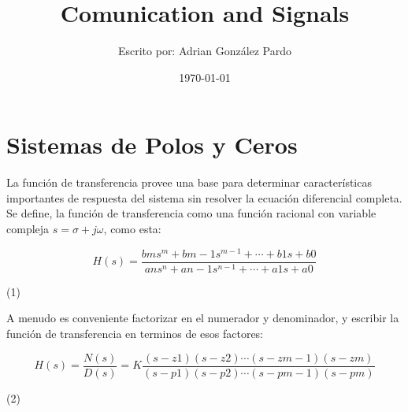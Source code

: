 \documentclass[10pt,a4paper]{article}
\title{Comunication and Signals}
\author{Escrito por: Adrian González Pardo}
\date{\today}
\begin{document}
\begin{center}
	\par\vspace{0.25cm}{
		Instituto Tecnológico de Massachusetts\\Departamento de Ingenieria Mecanica\\2.14 Análisis y diseño de sistemas de control de retroalimentación}
	\par{}
\end{center}
\section{Sistemas de Polos y Ceros}
La función de transferencia provee una base para determinar características importantes de respuesta del sistema sin resolver la ecuación diferencial completa. Se define, la función de transferencia como una función racional con variable compleja $s=\sigma + j\omega$, como esta:
\begin{center}
  \begin{minipage}{0.5\textwidth}
    \begin{center}
      \[H(s)=\frac{b{\scriptscriptstyle m}s^m+b{\scriptscriptstyle m-1}s^{m-1}+\cdots+b{\scriptscriptstyle 1}s+b{\scriptscriptstyle 0}} {a{\scriptscriptstyle n}s^n+a{\scriptscriptstyle n-1}s^{n-1}+\cdots+a{\scriptscriptstyle 1}s+a{\scriptscriptstyle 0}}\]
    \end{center}

  \end{minipage}
  \begin{minipage}{0.9\textwidth}
    \begin{flushright}
        (1)
    \end{flushright}
  \end{minipage}
\end{center}
A menudo es conveniente factorizar en el numerador y denominador, y escribir la función de transferencia en terminos de esos factores:
\begin{center}
  \begin{center}
    \[H(s)=\frac{N(s)}{D(s)}=K\frac{(s-z{\scriptscriptstyle 1})(s-z{\scriptscriptstyle 2})\cdots(s-z{\scriptscriptstyle m-1})(s-z{\scriptscriptstyle m})}{(s-p{\scriptscriptstyle 1})(s-p{\scriptscriptstyle 2})\cdots(s-p{\scriptscriptstyle m-1})(s-p{\scriptscriptstyle m})}\]
  \end{center}
  \begin{minipage}{0.9\textwidth}
    \begin{flushright}
        (2)
    \end{flushright}
  \end{minipage}
\end{center}
\end{document}
